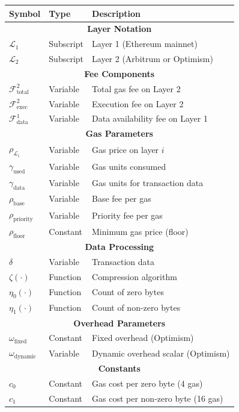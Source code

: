 \documentclass[letterpaper,10pt]{article} %
\newcommand{\layer}[1]{\mathcal{L}_{#1}}
\newcommand{\fee}[2]{\mathcal{F}_{#1}^{#2}}
\begin{document}
\begin{longtable}{l l p{8cm}}
\hline
\textbf{Symbol} & \textbf{Type} & \textbf{Description} \\
\hline
\endhead

\multicolumn{3}{c}{\textbf{Layer Notation}} \\
$\layer{1}$ & Subscript & Layer 1 (Ethereum mainnet) \\
$\layer{2}$ & Subscript & Layer 2 (Arbitrum or Optimism) \\

\multicolumn{3}{c}{\textbf{Fee Components}} \\
$\fee{\text{total}}{2}$ & Variable & Total gas fee on Layer 2 \\
$\fee{\text{exec}}{2}$ & Variable & Execution fee on Layer 2 \\
$\fee{\text{data}}{1}$ & Variable & Data availability fee on Layer 1 \\

\multicolumn{3}{c}{\textbf{Gas Parameters}} \\
$\rho_{\layer{i}}$ & Variable & Gas price on layer $i$ \\
$\gamma_{\text{used}}$ & Variable & Gas units consumed \\
$\gamma_{\text{data}}$ & Variable & Gas units for transaction data \\
$\rho_{\text{base}}$ & Variable & Base fee per gas \\
$\rho_{\text{priority}}$ & Variable & Priority fee per gas \\
$\rho_{\text{floor}}$ & Constant & Minimum gas price (floor) \\

\multicolumn{3}{c}{\textbf{Data Processing}} \\
$\delta$ & Variable & Transaction data \\
$\zeta(\cdot)$ & Function & Compression algorithm \\
$\eta_0(\cdot)$ & Function & Count of zero bytes \\
$\eta_1(\cdot)$ & Function & Count of non-zero bytes \\

\multicolumn{3}{c}{\textbf{Overhead Parameters}} \\
$\omega_{\text{fixed}}$ & Constant & Fixed overhead (Optimism) \\
$\omega_{\text{dynamic}}$ & Variable & Dynamic overhead scalar (Optimism) \\

\multicolumn{3}{c}{\textbf{Constants}} \\
$c_0$ & Constant & Gas cost per zero byte (4 gas) \\
$c_1$ & Constant & Gas cost per non-zero byte (16 gas) \\

\hline
\end{longtable}
\end{document}

